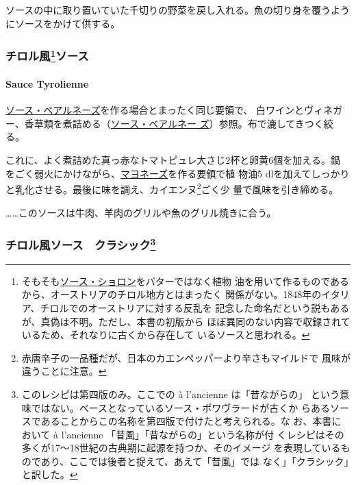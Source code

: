 \begin{recette}
ソースの中に取り置いていた千切りの野菜を戻し入れる。魚の切り身を覆うようにソースをかけて供する。

\hypertarget{ux30c1ux30edux30ebux98a8145ux30bdux30fcux30b9}{%
\subsubsection[チロル風ソース]{\texorpdfstring{チロル風\footnote{そもそも\protect\hyperlink{sauce-choron}{ソース・ショロン}をバターではなく植物
  油を用いて作るものであるから、オーストリアのチロル地方とはまったく
  関係がない。1848年のイタリア、チロルでのオーストリアに対する反乱を
  記念した命名だという説もあるが、真偽は不明。ただし、本書の初版から
  ほぼ異同のない内容で収録されているため、それなりに古くから存在して
  いるソースと思われる。}ソース}{チロル風ソース}}\label{ux30c1ux30edux30ebux98a8145ux30bdux30fcux30b9}}

\hypertarget{sauce-tyrolienne}{%
\paragraph{Sauce Tyrolienne}\label{sauce-tyrolienne}}


\protect\hyperlink{sauce-bearnaise}{ソース・ベアルネーズ}を作る場合とまったく同じ要領で、
白ワインとヴィネガー、香草類を煮詰める（\protect\hyperlink{sauce-bearnaise}{ソース・ベアルネー
ズ}）参照。布で漉してきつく絞る。

これに、よく煮詰めた真っ赤なトマトピュレ大さじ2杯と卵黄6個を加える。鍋
をごく弱火にかけながら、\protect\hyperlink{sauce-mayonnaise}{マヨネーズ}を作る要領で植
物油5
dlを加えてしっかりと乳化させる。最後に味を調え、カイエンヌ\footnote{赤唐辛子の一品種だが、日本のカエンペッパーより辛さもマイルドで
  風味が違うことに注意。}ごく少 量で風味を引き締める。

\ldots{}\ldots{}このソースは牛肉、羊肉のグリルや魚のグリル焼きに合う。

\maeaki

\hypertarget{ux30c1ux30edux30ebux98a8ux30bdux30fcux30b9ux30afux30e9ux30b7ux30c3ux30af146}{%
\subsubsection[チロル風ソース　クラシック]{\texorpdfstring{チロル風ソース　クラシック\footnote{このレシピは第四版のみ。ここでの
  à l'ancienne は「昔ながらの」
  という意味ではない。ベースとなっているソース・ポワヴラードが古くか
  らあるソースであることからこの名称を第四版で付けたと考えられる。な
  お、本書において à l'ancienne 「昔風」「昔ながらの」という名称が付
  くレシピはその多くが17〜18世紀の古典期に起源を持つか、そのイメージ
  を表現しているものであり、ここでは後者と捉えて、あえて「昔風」では
  なく」「クラシック」と訳した。}}{チロル風ソース　クラシック}}\label{ux30c1ux30edux30ebux98a8ux30bdux30fcux30b9ux30afux30e9ux30b7ux30c3ux30af146}}


\end{recette}
